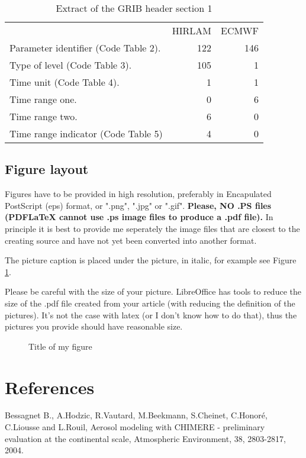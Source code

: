 \documentclass[11pt,a4paper]{article}
\begin{document}
\begin{table}
{\center\it\caption{ \label{tab:grib}Extract of the GRIB header section 1}}
\begin{center}
\begin{tabular}{lrr}
                                        & HIRLAM & ECMWF \\
 Parameter identifier (Code Table 2).   &   122  & 146 \\
 Type of level (Code Table 3).          &   105  &   1 \\
 Time unit (Code Table 4).              &     1  &   1 \\
 Time range one.                        &     0  &   6 \\
 Time range two.                        &     6  &   0 \\
 Time range indicator (Code Table 5)    &     4  &   0 \\
\end{tabular}
\end{center}
\end{table} 

\subsection{Figure layout}
Figures have to be provided in high resolution, preferably in Encapulated PostScript (eps) format, or ".png", ".jpg" or ".gif". 
\textbf{Please, NO .PS files (PDFLaTeX cannot use .ps image files to produce a .pdf file).}
In principle it is best to provide me seperately the image files that are closest to the creating source and have not yet been converted into another format.

The picture caption is placed under the picture, in italic, for example see Figure \ref{fig:O3}.

Please be careful with the size of your picture. LibreOffice has tools to reduce the size of the .pdf file created from your article (with reducing the definition of the pictures). It's not the case with latex (or I don't know how to do that), thus the pictures you provide should have reasonable size.

\begin{figure}[ht] %
\begin{center}
  \centerline{
  }
\end{center}
  {\center\it\caption{\label{fig:O3}
   Title of my figure}}
\end{figure}



\section{References}


Bessagnet B., A.Hodzic, R.Vautard, M.Beekmann, S.Cheinet, C.Honor\'e, C.Liousse and L.Rouil,
Aerosol modeling with CHIMERE - preliminary evaluation at the continental scale, Atmospheric
Environment, 38, 2803-2817, 2004.



\end{document}
